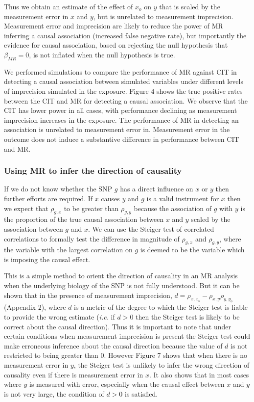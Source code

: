 \documentclass[]{article}
\begin{document}
Thus we obtain an estimate of the effect of \(x_o\) on \(y\) that is
scaled by the measurement error in \(x\) and \(y\), but is unrelated to
measurement imprecision. Measurement error and imprecision are likely to
reduce the power of MR inferring a causal association (increased false
negative rate), but importantly the evidence for causal association,
based on rejecting the null hypothesis that \(\beta_{MR} = 0\), is not
inflated when the null hypothesis is true.

We performed simulations to compare the performance of MR against CIT in
detecting a causal association between simulated variables under
different levels of imprecision simulated in the exposure. Figure 4
shows the true positive rates between the CIT and MR for detecting a
causal association. We observe that the CIT has lower power in all
cases, with performance declining as measurement imprecision increases
in the exposure. The performance of MR in detecting an association is
unrelated to measurement error in. Measurement error in the outcome does
not induce a substantive difference in performance between CIT and MR.

\subsubsection{Using MR to infer the direction of
causality}\label{using-mr-to-infer-the-direction-of-causality}

If we do not know whether the SNP \(g\) has a direct influence on \(x\)
or \(y\) then further efforts are required. If \(x\) causes \(y\) and
\(g\) is a valid instrument for \(x\) then we expect that \(\rho_{g,x}\)
to be greater than \(\rho_{g,y}\) because the association of \(g\) with
\(y\) is the proportion of the true causal association between \(x\) and
\(y\) scaled by the association between \(g\) and \(x\). We can use the
Steiger test of correlated correlations to formally test the difference
in magnitude of \(\rho_{g,x}\) and \(\rho_{g,y}\), where the variable
with the largest correlation on \(g\) is deemed to be the variable which
is imposing the causal effect.

This is a simple method to orient the direction of causality in an MR
analysis when the underlying biology of the SNP is not fully understood.
But it can be shown that in the presence of measurement imprecision,
\(d = \rho_{x, x_o} - \rho_{x,y}\rho_{y,y_o}\) (Appendix 2), where \(d\)
is a metric of the degree to which the Steiger test is liable to provide
the wrong estimate (\emph{i.e.} if \(d>0\) then the Steiger test is
likely to be correct about the causal direction). Thus it is important
to note that under certain conditions when measurement imprecision is
present the Steiger test could make erroneous inference about the causal
direction because the value of \(d\) is not restricted to being greater
than 0. However Figure 7 shows that when there is no measurement error
in \(y\), the Steiger test is unlikely to infer the wrong direction of
causality even if there is measurement error in \(x\). It also shows
that in most cases where \(y\) is measured with error, especially when
the causal effect between \(x\) and \(y\) is not very large, the
condition of \(d > 0\) is satisfied.
\end{document}
